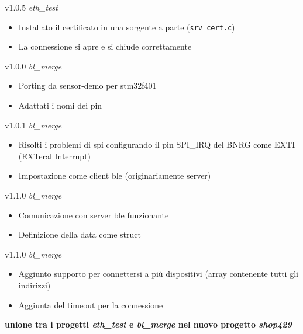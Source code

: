 v1.0.5 \textit{eth\_test}
	\begin{itemize}
		\item Installato il certificato in una sorgente a parte (\texttt{srv\_cert.c})
		\item La connessione si apre e si chiude correttamente
	\end{itemize}
v1.0.0 \textit{bl\_merge}
	\begin{itemize}
		\item Porting da sensor-demo per stm32f401
		\item Adattati i nomi dei pin
	\end{itemize}
v1.0.1 \textit{bl\_merge}
	\begin{itemize}
		\item Risolti i problemi di spi configurando il pin SPI\_IRQ del BNRG come EXTI (EXTeral Interrupt)
		\item Impostazione come client ble (originariamente server)
	\end{itemize}
v1.1.0 \textit{bl\_merge}
	\begin{itemize}
		\item Comunicazione con server ble funzionante
		\item Definizione della data come struct
	\end{itemize}
v1.1.0 \textit{bl\_merge}
	\begin{itemize}
		\item Aggiunto supporto per connettersi a pi\`{u} dispositivi (array contenente tutti gli indirizzi)
		\item Aggiunta del timeout per la connessione
	\end{itemize}

\textbf{unione tra i progetti \textit{eth\_test} e \textit{bl\_merge} nel nuovo progetto \textit{shop429}}

